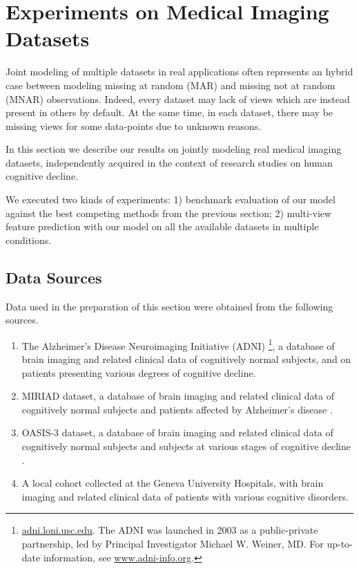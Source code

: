 \section{Experiments on Medical Imaging Datasets}
\label{sec:real}

% 
% 
% 

Joint modeling of multiple datasets in real applications often represents an hybrid case between modeling missing at random (MAR) and missing not at random (MNAR) observations.
Indeed, every dataset may lack of views which are instead present in others by default.
At the same time, in each dataset, there may be missing views for some data-points due to unknown reasons.

In this section we describe our results on jointly modeling real medical imaging datasets, independently acquired in the context of research studies on human cognitive decline.

We executed two kinds of experiments:
1) benchmark evaluation of our model against the best competing methods from the previous section;
2) multi-view feature prediction with our model on all the available datasets in multiple conditions.

\subsection{Data Sources}
\label{ssec:datasets}

Data used in the preparation of this section were obtained from the following sources.
\begin{enumerate}
%
\item The Alzheimer's Disease Neuroimaging Initiative (ADNI)
\footnote{
\href{http://adni.loni.usc.edu}{adni.loni.usc.edu}.
The ADNI was launched in 2003 as a public-private partnership, led by Principal Investigator Michael W. Weiner, MD. For up-to-date information, see \href{www.adni-info.org}{www.adni-info.org}.
},
a database of brain imaging and related clinical data of cognitively normal subjects, and on patients presenting various degrees of cognitive decline.
%
\item MIRIAD dataset, a database of brain imaging and related clinical data of cognitively normal subjects and patients affected by Alzheimer's disease \citep{Miriad}.
%
\item OASIS-3 dataset, a database of brain imaging and related clinical data of cognitively normal subjects and subjects at various stages of cognitive decline \citep{oasis3}.
%
\item A local cohort collected at the Geneva University Hospitals, with brain imaging and related clinical data of patients with various cognitive disorders.
\end{enumerate}

